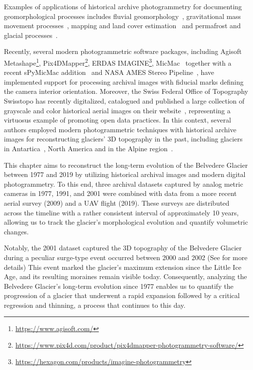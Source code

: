 Examples of applications of historical archive photogrammetry for documenting geomorphological processes includes fluvial geomorphology~\citep{Bakker2017, lane2010quantification}, gravitational mass movement processes~\citep{chandler1995steady, walstra2007historical, schwab2008landsliding}, mapping and land cover estimation~\citep{Giordano2018} and permafrost and glacial processes~\citep{kaab2002monitoring, Kaufmann2003, keutterling2006monitoring, mondino2008multi, Fischer2011}.

Recently, several modern photogrammetric software packages, including Agisoft Metashape\footnote{\url{https://www.agisoft.com/}}, Pix4DMapper\footnote{\url{https://www.pix4d.com/product/pix4dmapper-photogrammetry-software/}}, ERDAS IMAGINE\footnote{\url{https://hexagon.com/products/imagine-photogrammetry}}, MicMac~\citep{rupnik2017micmac, Zhang2021} together with a recent sPyMicMac addition~\citep{McNabb2020} and NASA AMES Stereo Pipeline~\citep{Beyer2018}, have implemented support for processing archival images with fiducial marks defining the camera interior orientation. 
Moreover, the Swiss Federal Office of Topography Swisstopo has recently digitalized, catalogued and published a large collection of grayscale and color historical aerial images on their website~\citep{Heisig2021}, representing a virtuosus example of promoting open data practices.
In this context, several authors employed modern photogrammetric techniques with historical archive images for reconstructing glaciers' 3D topography in the past, including 
glaciers in Antartica~\citep{Child2021, Dahle2024}, North America\citep{Knuth2023} and in the Alpine region~\citep{Molg2017, poli2020use}.

This chapter aims to reconstruct the long-term evolution of the Belvedere Glacier between 1977 and 2019 by utilizing historical archival images and modern digital photogrammetry.
To this end, three archival datasets captured by analog metric cameras in 1977, 1991, and 2001 were combined with data from a more recent aerial survey (2009) and a UAV flight (2019).
These surveys are distributed across the timeline with a rather consistent interval of approximately 10 years, allowing us to track the glacier's morphological evolution and quantify volumetric changes. 

Notably, the 2001 dataset captured the 3D topography of the Belvedere Glacier during a peculiar surge-type event \citep{Haeberli2002} occurred between 2000 and 2002 (See  for more  details)
This event marked the glacier's maximum extension since the Little Ice Age, and its resulting moraines remain visible today.
Consequently, analyzing the Belvedere Glacier's long-term evolution since 1977 enables us to quantify the progression of a glacier that underwent a rapid expansion followed by a critical regression and thinning, a process that continues to this day.

